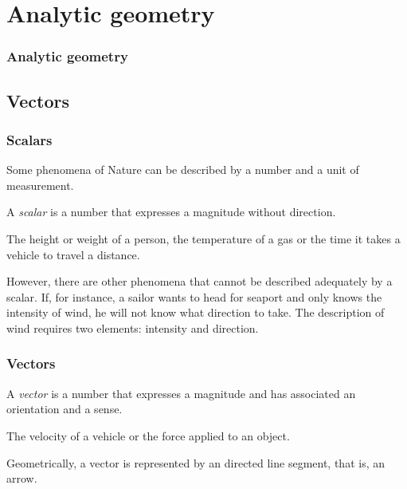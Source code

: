 \section{Analytic geometry}

\begin{frame}
\frametitle{Analytic geometry}
\setlength{\parskip}{0.3em}
\tableofcontents[sectionstyle=show/hide,hideothersubsections]
\end{frame}

\subsection{Vectors}

\begin{frame}
\frametitle{Scalars}
Some phenomena of Nature can be described by a number and a unit of measurement. 

\begin{definition}[Scalar]
A \emph{scalar} is a number that expresses a magnitude without direction.
\end{definition}
 The height or weight of a person, the temperature of a gas or the time it takes a vehicle to travel a distance.

However, there are other phenomena that cannot be described adequately by a scalar. 
If, for instance, a sailor wants to head for seaport and only knows the intensity of wind, he will not know what direction to take. The description of wind requires two elements: intensity and direction. 
\end{frame}


\begin{frame}
\frametitle{Vectors}
\begin{definition}[Vector]
A \emph{vector} is a number that expresses a magnitude and has associated an orientation and a sense.
\end{definition}

 The velocity of a vehicle or the force applied to an object. 

Geometrically, a vector is represented by an directed line segment, that is, an arrow. 
\begin{center}

\end{center}
\end{frame}


